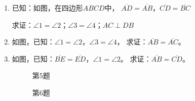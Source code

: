 \begin{enumerate}
    \item 已知：如图，在四边形$ABCD$中，
    $\overline{AD}=\overline{AB}$，$\overline{CD}=\overline{BC}$
    
    求证：$\angle 1=\angle 2$；$\angle 3=\angle 4$；$AC\perp DB$
  
    \item 如图，已知：$\angle 1=\angle 2$，$\angle 3=\angle 4$，
求证：$\overline{AB}=\overline{AC}$。
\item 如图，已知：$\overline{BE}=\overline{ED}$，$\angle 1=\angle 2$。
求证：$\overline{AB}=\overline{CD}$。

\begin{figure}
    \begin{minipage}[t]{0.48\linewidth}
    \centering
\begin{tikzpicture}[>=latex, scale=1]

    \end{tikzpicture}
    \caption*{第5题}
    \end{minipage}
    \begin{minipage}[t]{0.48\linewidth}
    \centering
    \begin{tikzpicture}[>=latex, scale=1]

    \end{tikzpicture}
    \caption*{第6题}
    \end{minipage}
    \end{figure}


\end{enumerate}
